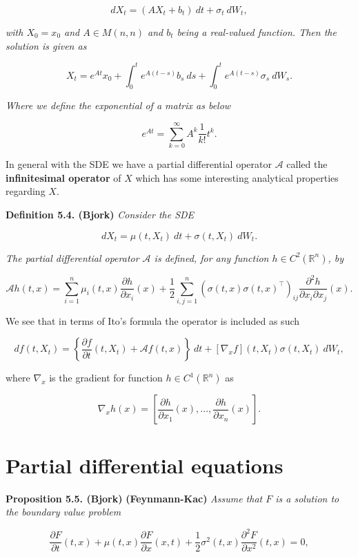 \documentclass[
]{book}
\begin{document}
\[
dX_t=(A X_t + b_t)\ dt+ \sigma_t\ dW_t,\tag{5.19}
\]

\emph{with \(X_0=x_0\) and \(A\in M(n,n)\) and \(b_t\) being a real-valued function. Then the solution is given as}

\[
X_t=e^{At}x_0+\int_0^te^{A(t-s)}b_s\ ds+\int_0^te^{A(t-s)}\sigma_s\ dW_s.\tag{5.20}
\]

\emph{Where we define the exponential of a matrix as below}

\[
e^{At}=\sum_{k=0}^\infty A^k\frac{1}{k!}t^k.
\]

In general with the SDE we have a partial differential operator \(\mathcal{A}\) called the \textbf{infinitesimal operator} of \(X\) which has some interesting analytical properties regarding \(X\).

\textbf{Definition 5.4. (Bjork)} \emph{Consider the SDE}

\[
dX_t=\mu(t,X_t)\ dt+\sigma(t,X_t)\ dW_t.\tag{5.21}
\]

\emph{The partial differential operator \(\mathcal{A}\) is defined, for any function \(h\in C^2(\mathbb{R}^n)\), by}

\[
\mathcal{A}h(t,x)=\sum_{i=1}^n\mu_i(t,x)\frac{\partial h}{\partial x_i}(x) + \frac{1}{2}\sum_{i,j=1}^n (\sigma(t,x)\sigma(t,x)^\top)_{ij}\frac{\partial^2h}{\partial x_i\partial x_j}(x).
\]

We see that in terms of Ito's formula the operator is included as such

\[
df(t,X_t)=\left\{\frac{\partial f}{\partial t}(t,X_t)+\mathcal{A}f(t,x)\right\}\ dt+[\nabla_xf](t,X_t)\sigma(t,X_t)\ dW_t,
\]

where \(\nabla_x\) is the gradient for function \(h\in C^1(\mathbb{R}^n)\) as

\[
\nabla_xh(x)=\left[\frac{\partial h}{\partial x_1}(x),...,\frac{\partial h}{\partial x_n}(x)\right].
\]

\hypertarget{partial-differential-equations}{%
\section{Partial differential equations}\label{partial-differential-equations}}

\textbf{Proposition 5.5. (Bjork)} \textbf{(Feynmann-Kac)} \emph{Assume that \(F\) is a solution to the boundary value problem}

\[
\frac{\partial F}{\partial t}(t,x)+\mu(t,x)\frac{\partial F}{\partial x}(x,t)+\frac{1}{2}\sigma^2(t,x)\frac{\partial^2 F}{\partial x^2}(t,x)=0,
\]
\end{document}
